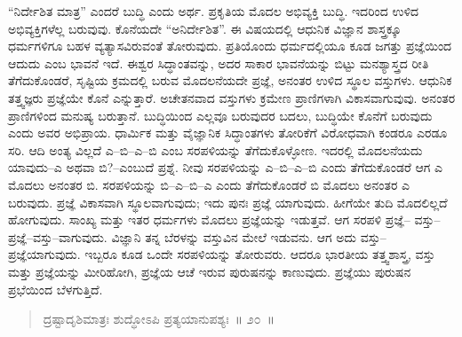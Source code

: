 “ನಿರ್ದೇಶಿತ ಮಾತ್ರ” ಎಂದರೆ ಬುದ್ಧಿ ಎಂದು ಅರ್ಥ. ಪ್ರಕೃತಿಯ ಮೊದಲ ಅಭಿವ್ಯಕ್ತಿ ಬುದ್ಧಿ. ಇದರಿಂದ ಉಳಿದ ಅಭಿವ್ಯಕ್ತಿಗಳೆಲ್ಲ ಬರುವುವು. ಕೊನೆಯದೇ “ಅನಿರ್ದೇಶಿತ”. ಈ ವಿಷಯದಲ್ಲಿ ಆಧುನಿಕ ವಿಜ್ಞಾನ ಶಾಸ್ತ್ರಕ್ಕೂ ಧರ್ಮಗಳಿಗೂ ಬಹಳ ವ್ಯತ್ಯಾಸವಿರುವಂತೆ ತೋರುವುದು. ಪ್ರತಿಯೊಂದು ಧರ್ಮದಲ್ಲಿಯೂ ಕೂಡ ಜಗತ್ತು ಪ್ರಜ್ಞೆಯಿಂದ ಆದುದು ಎಂಬ ಭಾವನೆ ಇದೆ. ಈಶ್ವರ ಸಿದ್ಧಾಂತವನ್ನು, ಅದರ ಸಾಕಾರ ಭಾವನೆಯನ್ನು ಬಿಟ್ಟು ಮನಶ್ಯಾಸ್ತ್ರದ ರೀತಿ ತೆಗೆದುಕೊಂಡರೆ, ಸೃಷ್ಟಿಯ ಕ್ರಮದಲ್ಲಿ ಬರುವ ಮೊದಲನೆಯದೇ ಪ್ರಜ್ಞೆ, ಅನಂತರ ಉಳಿದ ಸ್ಥೂಲ ವಸ್ತುಗಳು. ಆಧುನಿಕ ತತ್ತ್ವಜ್ಞರು ಪ್ರಜ್ಞೆಯೇ ಕೊನೆ ಎನ್ನುತ್ತಾರೆ. ಅಚೇತನವಾದ ವಸ್ತುಗಳು ಕ್ರಮೇಣ ಪ್ರಾಣಿಗಳಾಗಿ ವಿಕಾಸವಾಗುವುವು. ಅನಂತರ ಪ್ರಾಣಿಗಳಿಂದ ಮನುಷ್ಯ ಬರುತ್ತಾನೆ. ಬುದ್ಧಿಯಿಂದ ಎಲ್ಲವೂ ಬರುವುದರ ಬದಲು, ಬುದ್ಧಿಯೇ ಕೊನೆಗೆ ಬರುವುದು ಎಂದು ಅವರ ಅಭಿಪ್ರಾಯ. ಧಾರ್ಮಿಕ ಮತ್ತು ವೈಜ್ಞಾನಿಕ ಸಿದ್ಧಾಂತಗಳು ತೋರಿಕೆಗೆ ವಿರೋಧವಾಗಿ ಕಂಡರೂ ಎರಡೂ ಸರಿ. ಆದಿ ಅಂತ್ಯ ವಿಲ್ಲದೆ ಎ–ಬಿ–ಎ–ಬಿ ಎಂಬ ಸರಪಳಿಯನ್ನು ತೆಗೆದುಕೊಳ್ಳೋಣ. ಇದರಲ್ಲಿ ಮೊದಲನೆಯದು ಯಾವುದು–ಎ ಅಥವಾ ಬಿ?–ಎಂಬುದೆ ಪ್ರಶ್ನೆ. ನೀವು ಸರಪಳಿಯನ್ನು ಎ–ಬಿ–ಎ–ಬಿ ಎಂದು ತೆಗೆದುಕೊಂಡರೆ ಆಗ ಎ ಮೊದಲು ಅನಂತರ ಬಿ. ಸರಪಳಿಯನ್ನು ಬಿ–ಎ–ಬಿ–ಎ ಎಂದು ತೆಗೆದುಕೊಂಡರೆ ಬಿ ಮೊದಲು ಅನಂತರ ಎ ಬರುವುದು. ಪ್ರಜ್ಞೆ ವಿಕಾಸವಾಗಿ ಸ್ಥೂಲವಾಗುವುದು; ಇದು ಪುನಃ ಪ್ರಜ್ಞೆ ಯಾಗುವುದು. ಹೀಗೆಯೇ ತುದಿ ಮೊದಲಿಲ್ಲದೆ ಹೋಗುವುದು. ಸಾಂಖ್ಯ ಮತ್ತು ಇತರ ಧರ್ಮಗಳು ಮೊದಲು ಪ್ರಜ್ಞೆಯನ್ನು ಇಡುತ್ತವೆ. ಆಗ ಸರಪಳಿ ಪ್ರಜ್ಞೆ– ವಸ್ತು–ಪ್ರಜ್ಞೆ–ವಸ್ತು–ವಾಗುವುದು. ವಿಜ್ಞಾನಿ ತನ್ನ ಬೆರಳನ್ನು ವಸ್ತುವಿನ ಮೇಲೆ ಇಡುವನು. ಆಗ ಅದು ವಸ್ತು–ಪ್ರಜ್ಞೆಯಾಗುವುದು. ಇಬ್ಬರೂ ಕೂಡ ಒಂದೇ ಸರಪಳಿಯನ್ನು ತೋರುವರು. ಆದರೂ ಭಾರತೀಯ ತತ್ತ್ವಶಾಸ್ತ್ರ, ವಸ್ತು ಮತ್ತು ಪ್ರಜ್ಞೆಯನ್ನು ಮೀರಿಹೋಗಿ, ಪ್ರಜ್ಞೆಯ ಆಚೆ ಇರುವ ಪುರುಷನನ್ನು ಕಾಣುವುದು. ಪ್ರಜ್ಞೆಯು ಪುರುಷನ ಪ್ರಭೆಯಿಂದ ಬೆಳಗುತ್ತಿದೆ. 

\vspace{-0.2cm}

\begin{verse}
ದ್ರಷ್ಟಾದೃಶಿಮಾತ್ರಃ ಶುದ್ಧೋಽಪಿ ಪ್ರತ್ಯಯಾನುಪಶ್ಯಃ~॥ ೨೦~॥
\end{verse}

\vspace{-0.5cm}


\vskip 0.2cm

